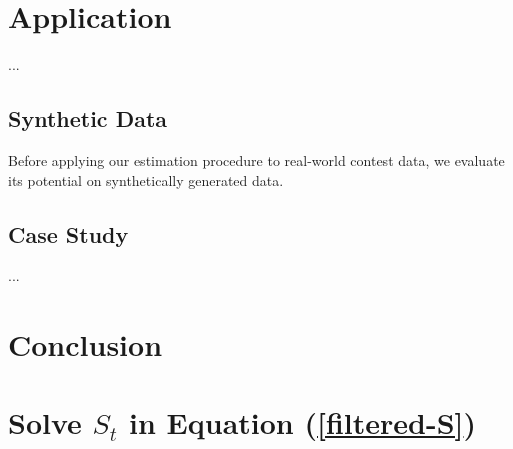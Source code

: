 \documentclass[a4paper, 11pt]{article}
\theoremstyle{plain} %
\begin{document}
\section{Application}

...

\subsection{Synthetic Data}

Before applying our estimation procedure to real-world contest data, we evaluate its potential on synthetically generated data.



\subsection{Case Study}

...


\newpage
\section{Conclusion}

\newpage


\newpage
\appendix
\small






\section{Solve $S_t$ in Equation (\ref{filtered-S})}\label{app-S-equ}
\end{document}
